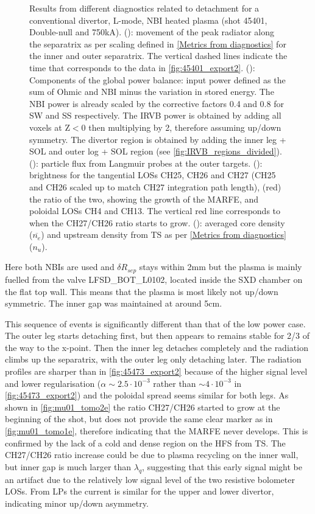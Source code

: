 \begin{figure}
     \caption{Results from different diagnostics related to detachment for a conventional divertor, L-mode, NBI heated plasma (shot 45401, Double-null and 750kA). (): movement of the peak radiator along the separatrix as per scaling defined in \autoref{Metrics from diagnostics} for the inner and outer separatrix. The vertical dashed lines indicate the time that corresponds to the data in \autoref{fig:45401_export2}. (): Components of the global power balance: input power defined as the sum of Ohmic and NBI minus the variation in stored energy. The NBI power is already scaled by the corrective factors 0.4 and 0.8 for SW and SS respectively. The IRVB power is obtained by adding all voxels at Z$<$0 then multiplying by 2, therefore assuming up/down symmetry. The divertor region is obtained by adding the inner leg + SOL and outer log + SOL region (see \autoref{fig:IRVB_regions_divided}). (): particle flux from Langmuir probes at the outer targets. (): brightness for the tangential LOSs CH25, CH26 and CH27 (CH25 and CH26 scaled up to match CH27 integration path length), (red) the ratio of the two, showing the growth of the MARFE, and poloidal LOSs CH4 and CH13. The vertical red line corresponds to when the CH27/CH26 ratio starts to grow. (): averaged core density ($\overline{n_e}$) and upstream density from TS as per \autoref{Metrics from diagnostics} ($n_u$).}
	\label{fig:mu01_tomo2}
\end{figure}
Here both NBIs are used and $\delta R_{sep}$ stays within 2mm but the plasma is mainly fuelled from the valve LFSD\_BOT\_L0102, located inside the SXD chamber on the flat top wall. This means that the plasma is most likely not up/down symmetric. The inner gap was maintained at around 5cm.

This sequence of events is significantly different than that of the low power case. The outer leg starts detaching first, but then appears to remains stable for 2/3 of the way to the x-point. Then the inner leg detaches completely and the radiation climbs up the separatrix, with the outer leg only detaching later. The radiation profiles are sharper than in \autoref{fig:45473_export2} because of the higher signal level and lower regularisation ($\alpha \sim 2.5 \cdot 10^{-3}$ rather than $\sim 4 \cdot 10^{-3}$ in \autoref{fig:45473_export2}) and the poloidal spread seems similar for both legs. As shown in \autoref{fig:mu01_tomo2e} the ratio CH27/CH26 started to grow at the beginning of the shot, but does not provide the same clear marker as in \autoref{fig:mu01_tomo1e}, therefore indicating that the MARFE never develops. This is confirmed by the lack of a cold and dense region on the HFS from TS. The CH27/CH26 ratio increase could be due to plasma recycling on the inner wall, but inner gap is much larger than $\lambda_q$, suggesting that this early signal might be an artifact due to the relatively low signal level of the two resistive bolometer LOSs. From LPs the current is similar for the upper and lower divertor, indicating minor up/down asymmetry.

